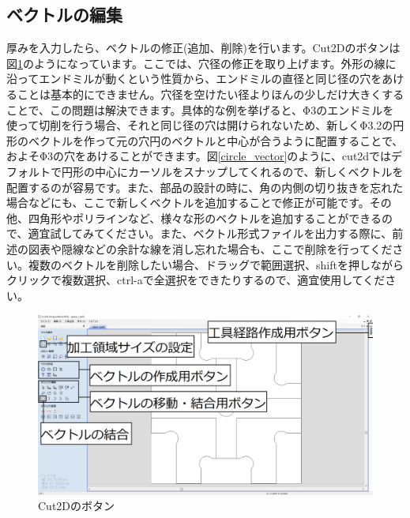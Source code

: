 \documentclass[b5paper, 9pt, twocolumn, titlepage,openany]{jsbook}%
\begin{document}

\clearpage
\subsection{ベクトルの編集}

厚みを入力したら、ベクトルの修正(追加、削除)を行います。Cut2Dのボタンは図\ref{button}のようになっています。ここでは、穴径の修正を取り上げます。外形の線に沿ってエンドミルが動くという性質から、エンドミルの直径と同じ径の穴をあけることは基本的にできません。穴径を空けたい径よりほんの少しだけ大きくすることで、この問題は解決できます。具体的な例を挙げると、Φ3のエンドミルを使って切削を行う場合、それと同じ径の穴は開けられないため、新しくΦ3.2の円形のベクトルを作って元の穴円のベクトルと中心が合うように配置することで、およそΦ3の穴をあけることができます。図\ref{circle_vector}のように、cut2dではデフォルトで円形の中心にカーソルをスナップしてくれるので、新しくベクトルを配置するのが容易です。また、部品の設計の時に、角の内側の切り抜きを忘れた場合などにも、ここで新しくベクトルを追加することで修正が可能です。その他、四角形やポリラインなど、様々な形のベクトルを追加することができるので、適宜試してみてください。また、ベクトル形式ファイルを出力する際に、前述の図表や隠線などの余計な線を消し忘れた場合も、ここで削除を行ってください。複数のベクトルを削除したい場合、ドラッグで範囲選択、shiftを押しながらクリックで複数選択、ctrl-aで全選択をできたりするので、適宜使用してください。\\

\begin{figure}[tbh]
  \begin{center}
    \begin{minipage}{1.0\columnwidth}
      \includegraphics[width=\columnwidth]{button.png}
    \end{minipage}
    \caption{Cut2Dのボタン    \label{button}}
  \end{center}
\end{figure}
\end{document}

